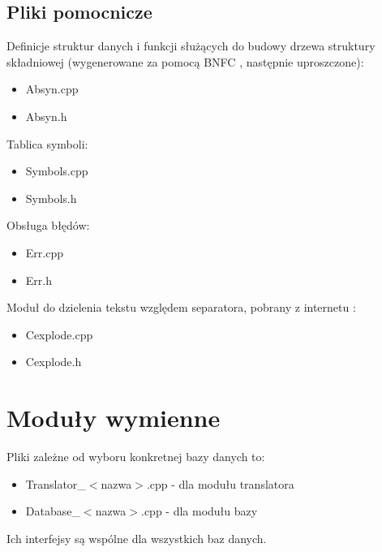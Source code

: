 

\section{Pliki pomocnicze}
Definicje struktur danych i funkcji służących do budowy drzewa struktury składniowej (wygenerowane za pomocą BNFC \cite{bnfc}, następnie uproszczone):
\begin{itemize}
 \item Absyn.cpp
 \item Absyn.h
\end{itemize}
Tablica symboli:
\begin{itemize}
 \item Symbols.cpp
\item Symbols.h
\end{itemize}
Obsługa błędów:
\begin{itemize}
 \item Err.cpp
\item Err.h
\end{itemize}
Moduł do dzielenia tekstu względem separatora, pobrany z internetu \cite{cexplode}:
\begin{itemize}
 \item Cexplode.cpp
 \item Cexplode.h
\end{itemize}


\chapter{Moduły wymienne}
Pliki zależne od wyboru konkretnej bazy danych to:
\begin{itemize}
 \item Translator\_$<$nazwa$>$.cpp - dla modułu translatora
\item Database\_$<$nazwa$>$.cpp - dla modułu bazy
\end{itemize}
Ich interfejsy są wspólne dla wszystkich baz danych.
